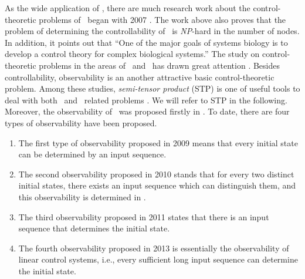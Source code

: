 As the wide application of \BCNs, there are much research work about the control-theoretic problems of \BCNs\ began with 2007 \cite{Akutsu2007Control}. The work above also proves that the problem of determining the controllability of \BCNs\ is {\em NP}-hard in the number of nodes. In addition, it points out that ``One of the major goals of systems biology is to develop a control theory for complex biological systems.'' The study on control-theoretic problems in the areas of \BNs\ and \BCNs\ has drawn great attention \cite{cheng2009controllability, Zhao2010Input, Cheng2011Identification, Cheng2011Analysis,Fornasini2013Observability}. Besides controllability, observability is an another  attractive basic control-theoretic problem.  Among these studies, \emph{semi-tensor product} (STP) is one of useful tools to deal with  both \BNs\ and \BCNs\  related problems \cite{cheng2009controllability}.  We will refer to STP in the following. Moreover,  the observability of \BCNs\ was proposed firstly in \cite{cheng2009controllability}. To date, there are four types of observability have been proposed. 
\begin{enumerate}
	\item The first type of observability proposed in 2009 \cite{cheng2009controllability} means that every initial state can be determined by an input sequence.
	
	\item 
	The second observability proposed in 2010 \cite{Zhao2010Input} stands that for every two distinct initial states, there exists an input sequence which can distinguish them, and this observability is determined in \cite{Li2015Controllability}.
	
	\item The third observability proposed in 2011 \cite{Cheng2011Identification} states that there is an input sequence that determines the initial state.
	
	\item  The fourth observability proposed in 2013 \cite{Fornasini2013Observability} is essentially the observability of linear control systems, i.e., every sufficient long input sequence can determine the initial state.
\end{enumerate}
 



